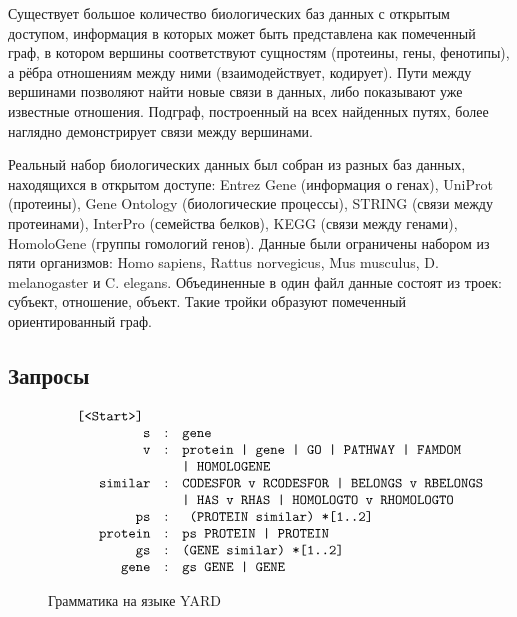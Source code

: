 \documentclass[14pt]{matmex-diploma}
\begin{document}
Существует большое количество биологических баз данных с открытым доступом, информация в которых может быть представлена как помеченный граф, в котором вершины соответствуют сущностям (протеины, гены, фенотипы), а рёбра отношениям между ними (взаимодействует, кодирует). Пути между вершинами позволяют найти новые связи в данных, либо показывают уже известные отношения. Подграф, построенный на всех найденных путях, более наглядно демонстрирует связи между вершинами.

Реальный набор биологических данных был собран из разных баз данных, находящихся в открытом доступе:  Entrez Gene (информация о генах), UniProt (протеины), Gene Ontology (биологические процессы), STRING (связи между протеинами), InterPro (семейства белков), KEGG (связи между генами), HomoloGene (группы гомологий генов). Данные были ограничены набором из пяти организмов: Homo sapiens, Rattus norvegicus, Mus musculus, D. melanogaster и C. elegans. Объединенные в один файл данные состоят из троек: субъект, отношение, объект. Такие тройки образуют помеченный ориентированный граф.
\subsection{Запросы}

\begin{figure}
$$
\begin{array}{crcl}
&\mbox{\texttt{ [<Start>] }} \\
&\mbox{\texttt{s}} &:& \mbox{\texttt{gene }} \\
&\mbox{\texttt{v}} &:& \mbox{\texttt{protein | gene | GO | PATHWAY | FAMDOM}} \\
&&&\mbox{\texttt{| HOMOLOGENE}} \\
&\mbox{\texttt{similar}} &:& \mbox{\texttt{CODESFOR v RCODESFOR | BELONGS v RBELONGS}} \\
&&&\mbox{\texttt{| HAS v RHAS | HOMOLOGTO v RHOMOLOGTO}} \\
&\mbox{\texttt{ps}} & :& \mbox{\texttt{ (PROTEIN similar) *[1..2]}} \\
&\mbox{\texttt{protein}} & :& \mbox{\texttt{ps PROTEIN | PROTEIN}} \\
&\mbox{\texttt{gs}} & :& \mbox{\texttt{(GENE similar) *[1..2]}} \\
&\mbox{\texttt{gene}} & :& \mbox{\texttt{gs GENE | GENE}} \\
\end{array}
$$
\caption{Грамматика на языке YARD}
\label{grammar}
\end{figure}
\end{document}
